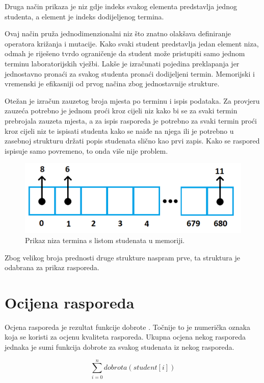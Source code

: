 \documentclass[times, utf8, zavrsni]{fer}
\begin{document}
Druga način prikaza je niz gdje indeks svakog elementa predstavlja jednog studenta, a element je indeks dodijeljenog termina.

Ovaj način pruža jednodimenzionalni niz što znatno olakšava definiranje operatora križanja i mutacije. Kako svaki student predstavlja jedan element niza, odmah je riješeno tvrdo ograničenje da student može pristupiti samo jednom terminu laboratorijskih vježbi. Lakše je izračunati pojedina preklapanja jer jednostavno pronaći za svakog studenta pronaći dodijeljeni termin. Memorijski i vremenski je efikasniji od prvog načina zbog jednostavnije strukture.

Otežan je izračun zauzetog broja mjesta po terminu i ispis podataka. Za provjeru zauzeća potrebno je jednom proći  kroz cijeli niz kako bi se za svaki termin prebrojala zauzeta mjesta, a za ispis rasporeda je potrebno za svaki termin proći kroz cijeli niz te ispisati studenta kako se naiđe na njega ili je potrebno u zasebnoj strukturu držati popis studenata slično kao prvi zapis. Kako se raspored ispisuje samo povremeno, to onda više nije problem.

\begin{figure}[htb]
\centering
\includegraphics[width=13cm]{images/prikaz_jednike_2.png}
\caption{Prikaz niza termina s listom studenata u memoriji.}
\label{fig:prikaz_jednike_2}
\end{figure}

Zbog velikog broja prednosti druge strukture naspram prve, ta struktura je odabrana za prikaz rasporeda.

\section{Ocijena rasporeda}

Ocjena rasporeda je rezultat funkcije dobrote . Točnije to je numerička oznaka koja se koristi za ocjenu kvaliteta rasporeda. Ukupna ocjena nekog rasporeda jednaka je sumi funkcija dobrote za svakog studenata iz nekog rasporeda.

\begin{equation}
\sum_{i=0}^{n} dobrota(student[i])
\label{eq:dobrota}
\end{equation}
\end{document}
